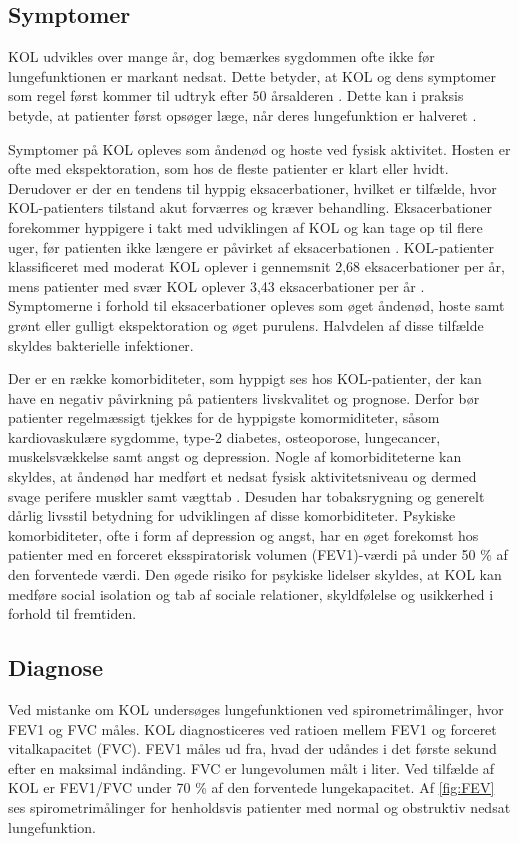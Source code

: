 \subsection{Symptomer}
KOL udvikles over mange år, dog bemærkes sygdommen ofte ikke før lungefunktionen er markant nedsat. Dette betyder, at KOL og dens symptomer som regel først kommer til udtryk efter $50$ årsalderen \cite{Lange2015}. Dette kan i praksis betyde, at patienter først opsøger læge, når deres lungefunktion er halveret \cite{dsam2016}.

Symptomer på KOL opleves som åndenød og hoste ved fysisk aktivitet. Hosten er ofte med ekspektoration, som hos de fleste patienter er klart eller hvidt.\cite{Basisbogen2016} Derudover er der en tendens til hyppig eksacerbationer, hvilket er tilfælde, hvor KOL-patienters tilstand akut forværres og kræver behandling. Eksacerbationer forekommer hyppigere i takt med udviklingen af KOL og kan tage op til flere uger, før patienten ikke længere er påvirket af eksacerbationen \cite{Anzueto2010}. KOL-patienter klassificeret med moderat KOL oplever i gennemsnit 2,68 eksacerbationer per år, mens patienter med svær KOL oplever 3,43 eksacerbationer per år \cite{Anzueto2010}.
Symptomerne i forhold til eksacerbationer opleves som øget åndenød, hoste samt grønt eller gulligt ekspektoration og øget purulens. Halvdelen af disse tilfælde skyldes bakterielle infektioner.\cite{Basisbogen2016,dsam2016} 

Der er en række komorbiditeter, som hyppigt ses hos KOL-patienter, der kan have en negativ påvirkning på patienters livskvalitet og prognose. Derfor bør patienter regelmæssigt tjekkes for de hyppigste komormiditeter, såsom kardiovaskulære sygdomme, type-2 diabetes, osteoporose, lungecancer, muskelsvækkelse samt angst og depression.
Nogle af komorbiditeterne kan skyldes, at åndenød har medført et nedsat fysisk aktivitetsniveau og dermed svage perifere muskler samt vægttab \cite{dsam2016}. Desuden har tobaksrygning og generelt dårlig livsstil betydning for udviklingen af disse komorbiditeter.\cite{dsam2016, McCarthy2015}
Psykiske komorbiditeter, ofte i form af depression og angst, har en øget forekomst hos patienter med en forceret eksspiratorisk volumen (FEV1)-værdi på under 50 \% af den forventede værdi. Den øgede risiko for psykiske lidelser skyldes, at KOL kan medføre social isolation og tab af sociale relationer, skyldfølelse og usikkerhed i forhold til fremtiden.\cite{dsam2016}

\subsection{Diagnose}
Ved mistanke om KOL undersøges lungefunktionen ved spirometrimålinger, hvor FEV1 og FVC måles.
KOL diagnosticeres ved ratioen mellem FEV1 og forceret vitalkapacitet (FVC). FEV1 måles ud fra, hvad der udåndes i det første sekund efter en maksimal indånding. FVC er lungevolumen målt i liter. Ved tilfælde af KOL er FEV1/FVC under 70 \% af den forventede lungekapacitet.\cite{Basisbogen2016} Af \autoref{fig:FEV} ses spirometrimålinger for henholdsvis patienter med normal og obstruktiv nedsat lungefunktion.\cite{Basisbogen2016, Sundhed2013}

